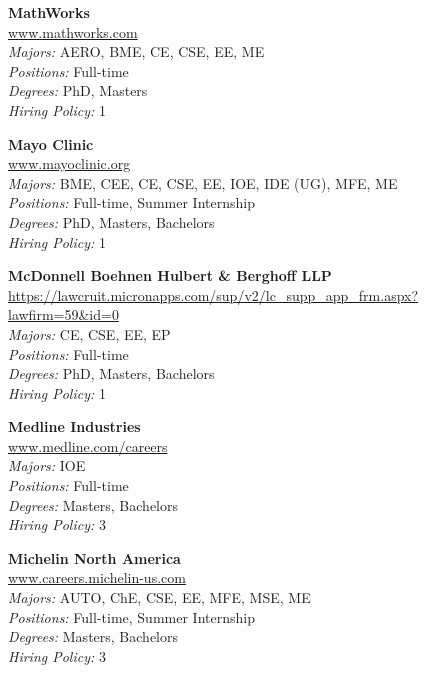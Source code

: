 \documentclass{article}
\begin{document}
\begin{center}
\begin{multicols}{3}
\begin{minipage}{.9\columnwidth}{\Large\bf MathWorks }\\
	\url{www.mathworks.com}\\
	\emph{Majors:} AERO, BME, CE, CSE, EE, ME\\
	\emph{Positions:} Full-time\\
	\emph{Degrees:} PhD, Masters\\
	\emph{Hiring Policy:} 1\\
\end{minipage}
 
\begin{minipage}{.9\columnwidth}{\Large\bf Mayo Clinic }\\
	\url{www.mayoclinic.org}\\
	\emph{Majors:} BME, CEE, CE, CSE, EE, IOE, IDE (UG), MFE, ME\\
	\emph{Positions:} Full-time, Summer Internship\\
	\emph{Degrees:} PhD, Masters, Bachelors\\
	\emph{Hiring Policy:} 1\\
\end{minipage}
 
\begin{minipage}{.9\columnwidth}{\Large\bf McDonnell Boehnen Hulbert \& Berghoff LLP }\\
	\url{https://lawcruit.micronapps.com/sup/v2/lc_supp_app_frm.aspx?lawfirm=59&id=0}\\
	\emph{Majors:} CE, CSE, EE, EP\\
	\emph{Positions:} Full-time\\
	\emph{Degrees:} PhD, Masters, Bachelors\\
	\emph{Hiring Policy:} 1\\
\end{minipage}
 
\begin{minipage}{.9\columnwidth}{\Large\bf Medline Industries }\\
	\url{www.medline.com/careers}\\
	\emph{Majors:} IOE\\
	\emph{Positions:} Full-time\\
	\emph{Degrees:} Masters, Bachelors\\
	\emph{Hiring Policy:} 3\\
\end{minipage}
 
\begin{minipage}{.9\columnwidth}{\Large\bf Michelin North America }\\
	\url{www.careers.michelin-us.com}\\
	\emph{Majors:} AUTO, ChE, CSE, EE, MFE, MSE, ME\\
	\emph{Positions:} Full-time, Summer Internship\\
	\emph{Degrees:} Masters, Bachelors\\
	\emph{Hiring Policy:} 3\\
\end{minipage}
 

\end{multicols}
\end{center}
\end{document}
